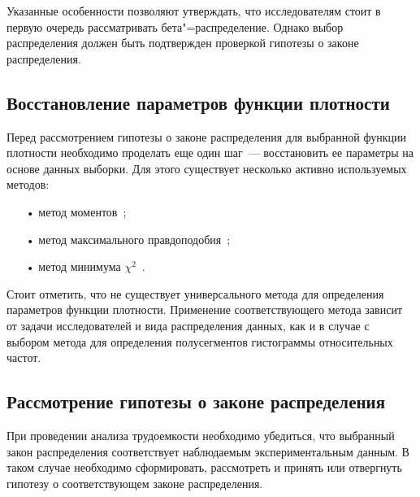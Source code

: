 \documentclass[a4paper, article, 14pt]{extarticle}
\begin{document}
Указанные особенности позволяют утверждать, что исследователям стоит в первую очередь рассматривать бета"=распределение. Однако выбор распределения должен быть подтвержден проверкой гипотезы о законе распределения.


\subsection{Восстановление параметров функции плотности}\label{sec:distribtuion_parameters}

Перед рассмотрением гипотезы о законе распределения для выбранной функции плотности необходимо проделать еще один шаг~--- восстановить ее параметры на основе данных выборки. Для этого существует несколько активно используемых методов:

\begin{enumerate}
	\item[•] метод моментов~\cite{prohorov, koroluk};
	
	\item[•] метод максимального правдоподобия~\cite{koroluk};
	
	\item[•] метод минимума $\chi^2$~\cite{koroluk}.
\end{enumerate}

Стоит отметить, что не существует универсального метода для определения параметров функции плотности. Применение соответствующего метода зависит от задачи исследователей и вида распределения данных, как и в случае с выбором метода для определения полусегментов гистограммы относительных частот.


\subsection{Рассмотрение гипотезы о законе распределения}\label{sec:distribtuion_hypothesys}

При проведении анализа трудоемкости необходимо убедиться, что выбранный закон распределения соответствует наблюдаемым экспериментальным данным. В таком случае необходимо сформировать, рассмотреть и принять или отвергнуть гипотезу о соответствующем законе распределения.
\end{document}
